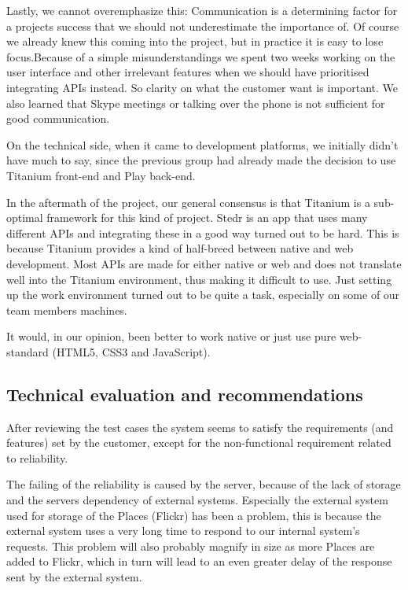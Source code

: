 Lastly, we cannot overemphasize this: Communication is a determining factor for a projects success that we should not underestimate the importance of. Of course we already knew this coming into the project, but in practice it is easy to lose focus.Because of a simple misunderstandings we spent two weeks working on the user interface and other irrelevant features when we should have prioritised integrating APIs instead. So clarity on what the customer want is important. We also learned that Skype meetings or talking over the phone is not sufficient for good communication.

On the technical side, when it came to development platforms, we initially didn't have much to say, since the previous group had already made the decision to use Titanium front-end and Play back-end.

In the aftermath of the project, our general consensus is that Titanium is a sub-optimal framework for this kind of project. Stedr is an app that uses many different APIs and integrating these in a good way turned out to be hard. This is because Titanium provides a kind of half-breed between native and web development. Most APIs are made for either native or web and does not translate well into the Titanium environment, thus making it difficult to use. Just setting up the work environment turned out to be quite a task, especially on some of our team members machines. 

It would, in our opinion, been better to work native or just use pure web-standard (HTML5, CSS3 and JavaScript).

	\subsection{Technical evaluation and recommendations}

After reviewing the test cases the system seems to satisfy the requirements (and features) set by the customer, except for the non-functional requirement related to reliability.

The failing of the reliability is caused by the server, because of the lack of storage and the servers dependency of external systems. Especially the external system used for storage of the Places (Flickr) has been a problem, this is because the external system uses a very long time to respond to our internal system's requests. This problem will also probably magnify in size as more Places are added to Flickr, which in turn will lead to an even greater delay of the response sent by the external system.

